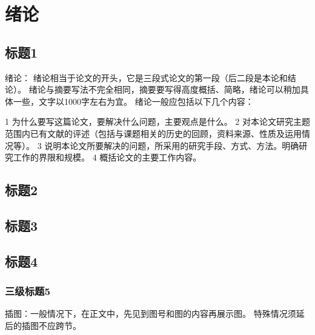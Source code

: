 \chapter{绪论}
\setcounter{page}{1}



\section{标题1}

绪论：
绪论相当于论文的开头，它是三段式论文的第一段（后二段是本论和结论）{\cite{chinesepainting}}。
绪论与摘要写法不完全相同，摘要要写得高度概括、简略，绪论可以稍加具体一些，文字以1000字左右为宜。
绪论一般应包括以下几个内容：

1 为什么要写这篇论文，要解决什么问题，主要观点是什么。
2 对本论文研究主题范围内已有文献的评述（包括与课题相关的历史的回顾，资料来源、性质及运用情况等）。
3 说明本论文所要解决的问题，所采用的研究手段、方式、方法。明确研究工作的界限和规模。
4 概括论文的主要工作内容。
\section{标题2}
\section{标题3}
\section{标题4}

\subsection{三级标题5}
插图：一般情况下，在正文中，先见到图号和图的内容再展示图。
特殊情况须延后的插图不应跨节。

